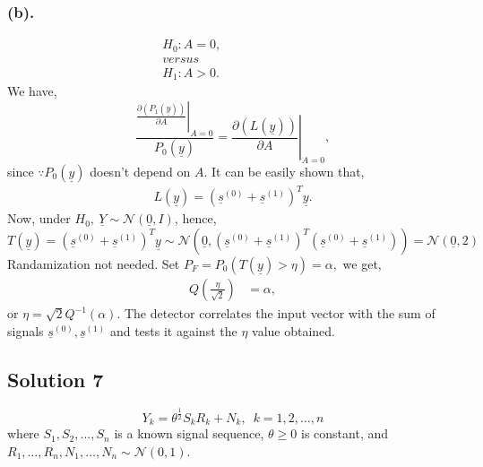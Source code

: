 \documentclass[a4paper,english,12pt]{article}
\begin{document}
\subsubsection*{(b).}
\begin{gather*}
H_0: A=0,\\
versus\hspace{100pt}\\
H_1: A>0.
\end{gather*}
We have,
\begin{equation*}
\frac{\left.\frac{\partial(P_1(\underline{y}))}{\partial A}\right|_{A=0}}{P_0(\underline{y})}=\left. \frac{\partial(L(\underline{y}))}{\partial
A} \right|_{A=0},
\end{equation*}
since $\because P_0(\underline{y})$ doesn't depend on $A$. It can be easily shown that,
\begin{align*}
L(\underline{y})={({\underline{s}}^{(0)} + {\underline{s}}^{(1)})}^T \underline{y}.
\end{align*}
Now, under $H_0,~\underline{Y}\sim\mathcal{N}(\underline{0},I)$, hence,
\begin{equation*}
T(\underline{y})={({\underline{s}}^{(0)} + {\underline{s}}^{(1)})}^T \underline{y} \sim \mathcal{N}(\underline{0},{({\underline{s}}^{(0)} + {\underline{s}}^{(1)})}^T{({\underline{s}}^{(0)} + {\underline{s}}^{(1)})})=\mathcal{N}(\underline{0},2)
\end{equation*}
Randamization not needed. Set $P_F=P_0(T(\underline{y}) > \eta)=\alpha,$ we get,
\begin{align*}
Q\left( \frac{\eta}{\sqrt{2}}\right)&=\alpha,
\end{align*}
or $\eta = \sqrt{2} Q^{-1} \left(\alpha \right)$. The detector correlates the input vector with the sum of signals ${\underline{s}}^{(0)}, {\underline{s}}^{(1)}$ and tests it against the $\eta$ value obtained.
\hypertarget{solution7}{\subsection*{Solution 7}}
\begin{equation*}
Y_k=\theta^{\frac{1}{2}}S_kR_k+N_k,\,\,\, k=1,2,\dots,n 
\end{equation*}
where $S_1,S_2,...,S_n$ is a known signal sequence, $\theta\geq0$ is constant, and $R_1, \dots, R_n,N_1,\dots, N_n \sim \mathcal{N}(0,1)$.
\end{document}
